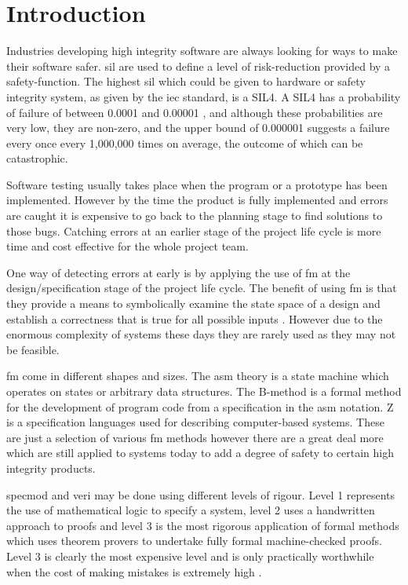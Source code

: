 
\chapter{Introduction}
\label{ch:introduction}

Industries developing high integrity software are always looking for ways to make their software safer. \gls{sil} are used to define a level of risk-reduction provided by a safety-function. The highest \gls{sil} \cite{siliso} which could be given to hardware or safety integrity system, as given by the \gls{iec} \cite{iec} standard, is a SIL4. A SIL4 has a probability of failure of between 0.0001 and 0.00001 \cite{IEC61508}, and although these probabilities are very low, they are non-zero, and the upper bound of 0.000001 suggests a failure every once every 1,000,000 times on average, the outcome of which can be catastrophic.

Software testing usually takes place when the program or a prototype has been implemented. However by the time the product is fully implemented and errors are caught it is expensive to go back to the planning stage to find solutions to those bugs. Catching errors at an earlier stage of the project life cycle is more time and cost effective for the whole project team.

One way of detecting errors at early is by applying the use of \gls{fm} at the design/specification stage of the project life cycle. The benefit of using \gls{fm} is that they provide a means to symbolically examine the state space of a design and establish a correctness that is true for all possible inputs \cite{wifrm}. However due to the enormous complexity of systems these days they are rarely used as they may not be feasible. 

\Gls{fm} come in different shapes and sizes. The \gls{asm} theory \cite{Borger:2003:ASM:829603} is a state machine which operates on states or arbitrary data structures. The B-method \cite{bmeth} is a formal method for the development of program code from a specification in the \gls{asm} notation. Z \cite{spiveyreferencemanual} is a specification languages used for describing computer-based systems. These are just a selection of various \gls{fm} methods however there are a great deal more which are still applied to systems today to add a degree of safety to certain high integrity products.

\Gls{specmod} and \gls{veri} may be done using different levels of rigour. Level 1 represents the use of mathematical logic to specify a system, level 2 uses a handwritten approach to proofs and level 3 is the most rigorous application of formal methods which uses theorem provers to undertake fully formal machine-checked proofs. Level 3 is clearly the most expensive level and is only practically worthwhile when the cost of making mistakes is extremely high \cite{encyclopedia}.

